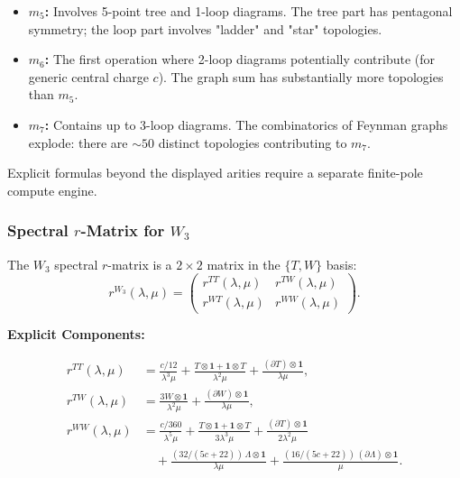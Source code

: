 \begin{itemize}
\item \textbf{$m_5$:} Involves 5-point tree and 1-loop diagrams. The tree part has pentagonal symmetry; the loop part involves "ladder" and "star" topologies.

\item \textbf{$m_6$:} The first operation where 2-loop diagrams potentially contribute (for generic central charge $c$). The graph sum has substantially more topologies than $m_5$.

\item \textbf{$m_7$:} Contains up to 3-loop diagrams. The combinatorics of Feynman graphs explode: there are $\sim 50$ distinct topologies contributing to $m_7$.
\end{itemize}

Explicit formulas beyond the displayed arities require a separate
finite-pole compute engine.

\subsubsection{Spectral $r$-Matrix for $W_3$}

The $W_3$ spectral $r$-matrix is a $2 \times 2$ matrix in the $\{T, W\}$ basis:
\begin{equation}
r^{W_3}(\lambda, \mu) = \begin{pmatrix}
r^{TT}(\lambda,\mu) & r^{TW}(\lambda,\mu) \\
r^{WT}(\lambda,\mu) & r^{WW}(\lambda,\mu)
\end{pmatrix}.
\end{equation}

\textbf{Explicit Components:}

\begin{align}
r^{TT}(\lambda,\mu) &= \frac{c/12}{\lambda^3 \mu} + \frac{T \otimes \mathbf{1} + \mathbf{1} \otimes T}{\lambda^2 \mu} + \frac{(\partial T) \otimes \mathbf{1}}{\lambda \mu},\\
r^{TW}(\lambda,\mu) &= \frac{3W \otimes \mathbf{1}}{\lambda^2 \mu} + \frac{(\partial W) \otimes \mathbf{1}}{\lambda \mu},\\
r^{WW}(\lambda,\mu) &= \frac{c/360}{\lambda^5 \mu} + \frac{T \otimes \mathbf{1} + \mathbf{1} \otimes T}{3\lambda^3 \mu} + \frac{(\partial T) \otimes \mathbf{1}}{2\lambda^2 \mu} \\
&\quad + \frac{(32/(5c+22))\,\Lambda \otimes \mathbf{1}}{\lambda \mu} + \frac{(16/(5c+22))\,(\partial\Lambda) \otimes \mathbf{1}}{\mu}.
\end{align}

